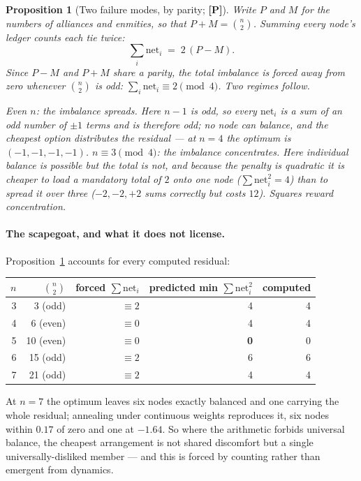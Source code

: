 \documentclass[11pt]{article}
\numberwithin{equation}{section}
\theoremstyle{plain}
\newtheorem{proposition}[theorem]{Proposition}
\theoremstyle{definition}
\theoremstyle{remark}
\begin{document}
\begin{proposition}[Two failure modes, by parity; \textbf{[P]}]
\label{ad:prop:parity}
Write $P$ and $M$ for the numbers of alliances and enmities, so that
$P+M=\binom n2$. Summing every node's ledger counts each tie twice:
\begin{equation}\label{ad:eq:parity}
\sum_i \mathrm{net}_i \;=\; 2\,(P-M).
\end{equation}
Since $P-M$ and $P+M$ share a parity, the total imbalance is
\emph{forced} away from zero whenever $\binom n2$ is odd:
$\sum_i\mathrm{net}_i\equiv2\pmod 4$. Two regimes follow.

\emph{Even $n$: the imbalance spreads.} Here $n-1$ is odd, so every
$\mathrm{net}_i$ is a sum of an odd number of $\pm1$ terms and is
therefore odd; \emph{no} node can balance, and the cheapest option
distributes the residual --- at $n=4$ the optimum is $(-1,-1,-1,-1)$. \emph{$n\equiv3\pmod4$: the imbalance concentrates.} Here individual
balance is possible but the total is not, and because the penalty is
\emph{quadratic} it is cheaper to load a mandatory total of $2$ onto one
node ($\sum\mathrm{net}_i^2=4$) than to spread it over three
($-2,-2,+2$ sums correctly but costs $12$). Squares reward
concentration.
\end{proposition}

\paragraph{The scapegoat, and what it does not license.}\label{ad:rem:scapegoat}
Proposition~\ref{ad:prop:parity} accounts for every computed residual:
\begin{center}\small
\begin{tabular}{@{}rrrrr@{}}
\toprule
$n$ & $\binom n2$ & forced $\sum\mathrm{net}_i$ & predicted min
$\sum\mathrm{net}_i^2$ & computed\\
\midrule
3 & 3 (odd) & $\equiv2$ & 4 & 4\\
4 & 6 (even) & $\equiv0$ & 4 & 4\\
5 & 10 (even) & $\equiv0$ & \textbf{0} & 0\\
6 & 15 (odd) & $\equiv2$ & 6 & 6\\
7 & 21 (odd) & $\equiv2$ & 4 & 4\\
\bottomrule
\end{tabular}
\end{center}
At $n=7$ the optimum leaves six nodes exactly balanced and one carrying
the whole residual; annealing under continuous weights reproduces it,
six nodes within $0.17$ of zero and one at $-1.64$. So where the
arithmetic forbids universal balance, the cheapest arrangement is not
shared discomfort but a single universally-disliked member --- and this
is forced by counting rather than emergent from dynamics.
\end{document}
